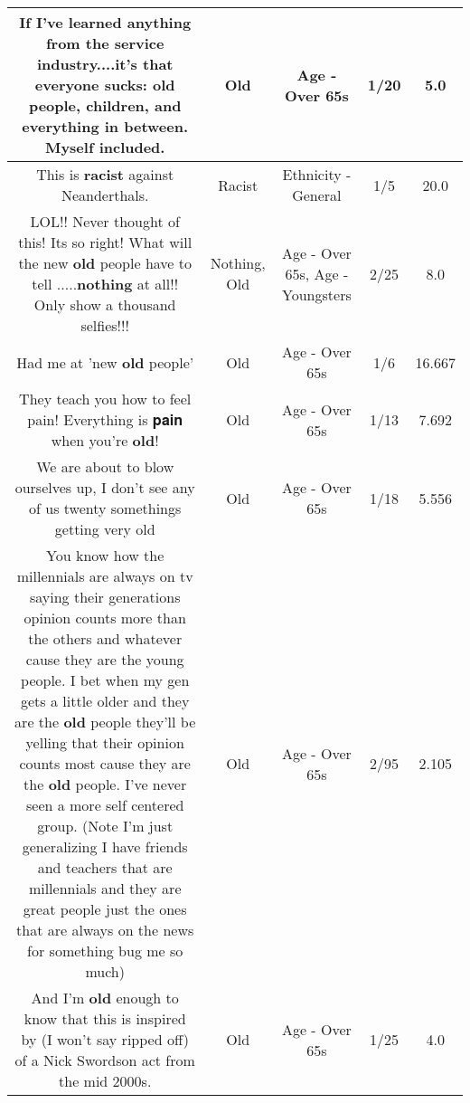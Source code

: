 \documentclass[11pt]{article}
\newlength\mylength
\begin{document}
\begin{center}
\begin{longtable}{|C{.65\mylength}|C{.30\mylength}|C{.12\mylength}|C{.12\mylength}|C{.12\mylength}|}
  \small If I've learned anything from the service industry....it's that everyone sucks: \textbf{old} people, children, and everything in between. Myself included.\normalsize   & Old & Age - Over 65s & 1/20 & 5.0 \\  \hline
  \small This is \textbf{racist} against Neanderthals.\normalsize   & Racist & Ethnicity - General & 1/5 & 20.0 \\  \hline
  \small LOL!! Never thought of this! Its so right! What will the new \textbf{old} people have to tell .....\textbf{nothing} at all!! Only show a thousand selfies!!!\normalsize   & Nothing, Old & Age - Over 65s, Age - Youngsters & 2/25 & 8.0 \\  \hline
  \small Had me at 'new \textbf{old} people'\normalsize   & Old & Age - Over 65s & 1/6 & 16.667 \\  \hline
  \small They teach you how to feel pain! Everything is 𝐩𝐚𝐢𝐧 when you're \textbf{old}!\normalsize   & Old & Age - Over 65s & 1/13 & 7.692 \\  \hline
  \small We are about to blow ourselves up, I don't see any of us twenty somethings getting very old\normalsize   & Old & Age - Over 65s & 1/18 & 5.556 \\  \hline
  \small You know how the millennials are always on tv saying their generations opinion counts more than the others and whatever cause they are the young people. I bet when my gen gets a little older and they are the \textbf{old} people they'll be yelling that their opinion counts most cause they are the \textbf{old} people. I've never seen a more self centered group. (Note I'm just generalizing I have friends and teachers that are millennials and they are great people just the ones that are always on the news for something bug me so much)\normalsize   & Old & Age - Over 65s & 2/95 & 2.105 \\  \hline
  \small And I'm \textbf{old} enough to know that this is inspired by (I won't say ripped off) of a Nick Swordson act from the mid 2000s.\normalsize   & Old & Age - Over 65s & 1/25 & 4.0 \\  \hline

\end{longtable}
\end{center}
\end{document}
